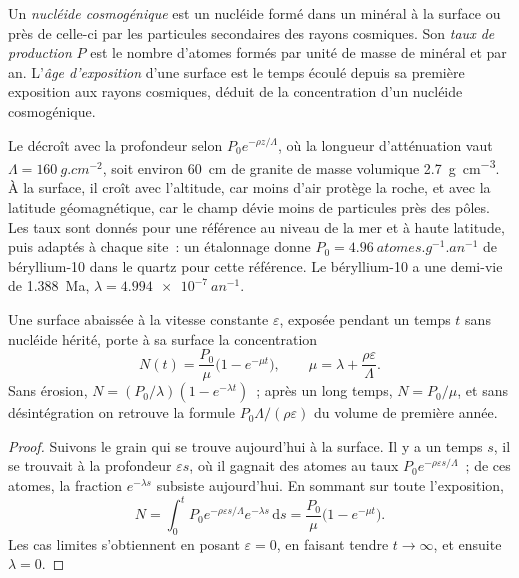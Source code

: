 \begin{definition}
\label{def:b3:advanced-geochronology:cosmogenic}
Un \emph{nucléide cosmogénique} est un nucléide formé
dans un minéral à la surface ou près de celle-ci par les particules secondaires des rayons cosmiques. Son
\emph{taux de production} $P$ est le nombre
d'atomes formés par unité de masse de minéral et par an. L'\emph{âge
d'exposition} d'une surface est le temps écoulé depuis sa première exposition
aux rayons cosmiques, déduit de la concentration d'un nucléide cosmogénique.
\end{definition}

Le  décroît avec la profondeur selon $P_0e^{-\rho z/\Lambda}$, où
la longueur d'atténuation vaut $\Lambda = \qty{160}{g.cm^{-2}}$, soit environ
\qty{60}{cm} de granite de masse volumique \qty{2.7}{g.cm^{-3}}. À la surface, il
croît avec l'altitude, car moins d'air protège la roche, et avec
la latitude géomagnétique, car le champ dévie moins de particules près des
pôles. Les taux sont donnés pour une référence au niveau de la mer et à haute latitude, puis
adaptés à chaque site~: un étalonnage donne $P_0 = \qty{4.96}{atomes.g^{-1}.an^{-1}}$
de béryllium-10 dans le quartz pour cette référence. Le béryllium-10 a une demi-vie de
\qty{1.388}{Ma}, $\lambda = \qty{4.994e-7}{an^{-1}}$.

\begin{theorem}\label{thm:b3:advanced-geochronology:exposure}
Une surface abaissée à la vitesse constante $\varepsilon$, exposée pendant un temps $t$
sans nucléide hérité, porte à sa surface la concentration
\[
N(t) = \frac{P_0}{\mu}\bigl(1 - e^{-\mu t}\bigr), \qquad
\mu = \lambda + \frac{\rho\varepsilon}{\Lambda}.
\]
Sans érosion, $N = (P_0/\lambda)(1 - e^{-\lambda t})$~; après un long temps,
$N = P_0/\mu$, et sans désintégration on retrouve la formule $P_0\Lambda/(\rho\varepsilon)$
du volume de première année.
\end{theorem}

\begin{proof}
Suivons le grain qui se trouve aujourd'hui à la surface. Il y a un temps $s$, il se trouvait à la
profondeur $\varepsilon s$, où il gagnait des atomes au taux $P_0e^{-\rho\varepsilon
s/\Lambda}$~; de ces atomes, la fraction $e^{-\lambda s}$ subsiste aujourd'hui. En sommant
sur toute l'exposition,
\[
N = \int_0^t P_0e^{-\rho\varepsilon s/\Lambda}e^{-\lambda s}\,\mathrm ds
= \frac{P_0}{\mu}\bigl(1 - e^{-\mu t}\bigr).
\]
Les cas limites s'obtiennent en posant $\varepsilon = 0$, en faisant tendre $t \to \infty$, et
ensuite $\lambda = 0$.
\end{proof}

